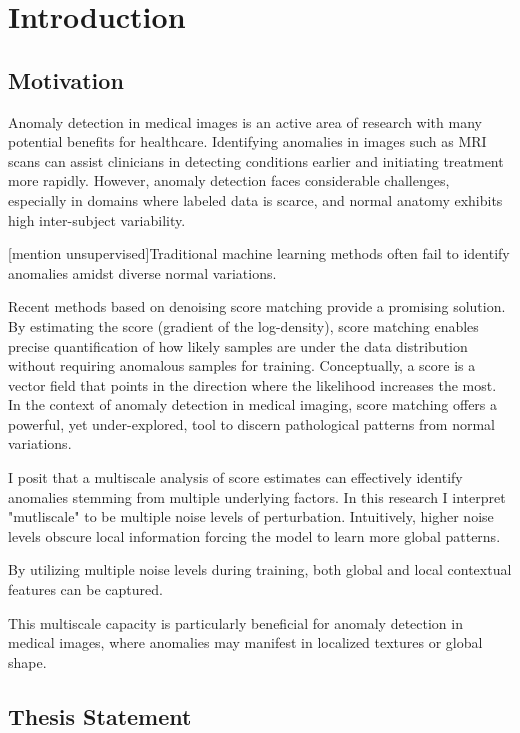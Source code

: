 \chapter{Introduction}

\section{Motivation}

Anomaly detection in medical images is an active area of research with many potential benefits for healthcare. Identifying anomalies in images such as MRI scans can assist clinicians in detecting conditions earlier and initiating treatment more rapidly. However, anomaly detection faces considerable challenges, especially in domains where labeled data is scarce, and normal anatomy exhibits high inter-subject variability.

[mention unsupervised]Traditional machine learning methods often fail to identify anomalies amidst diverse normal variations.

Recent methods based on denoising score matching provide a promising solution. By estimating the score (gradient of the log-density), score matching enables precise quantification of how likely samples are under the data distribution without requiring anomalous samples for training. Conceptually, a score is a vector field that points in the direction where the likelihood increases the most. In the context of anomaly detection in medical imaging, score matching offers a powerful, yet under-explored, tool to discern pathological patterns from normal variations.

I posit that a multiscale analysis of score estimates can effectively identify anomalies stemming from multiple underlying factors. In this research I interpret "mutliscale" to be multiple noise levels of perturbation.
Intuitively, higher noise levels obscure local information forcing the model to learn more global patterns. 

By utilizing multiple noise levels during training, both global and local contextual features can be captured.

This multiscale capacity is particularly beneficial for anomaly detection in medical images, where anomalies may manifest in localized textures or global shape.


\section{Thesis Statement}

